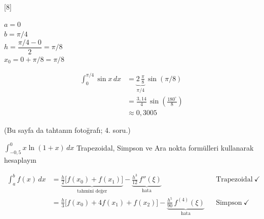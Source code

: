 \documentclass[11pt,a4paper]{article}
\begin{document}
[8]

\noindent
\begin{minipage}[t]{0.42\linewidth}
$a = 0$\\
$b = \pi/4$\\[1mm]
$h = \dfrac{\pi/4 - 0}{2} = \pi/8$\\[1mm]
$x_0 = 0 + \pi/8 = \pi/8$
\end{minipage}\hfill
\begin{minipage}[t]{0.55\linewidth}
\begin{align*}
  \int_0^{\pi/4} \sin x\,dx &= \underbrace{2\,\frac{\pi}{8}}_{\pi/4}\,\sin(\pi/8)\\
  &= \frac{3{,}14}{4}\,\sin\left(\frac{180^\circ}{8}\right)\\
  &\boxed{\approx 0{,}3005}
\end{align*}
\end{minipage}

{\small\color{kursunkalem}(Bu sayfa da tahtanın fotoğrafı; 4. soru.)}

\begin{ornek}[4]
$\displaystyle\int_{-0{,}5}^{0} x\ln(1+x)\,dx$ \qquad Trapezoidal, Simpson ve Ara nokta formülleri kullanarak
hesaplayın
\end{ornek}
\begin{align*}
  \int_a^b f(x)\,dx &= \underbrace{\frac{h}{2}\Big[f(x_0) + f(x_1)\Big]}_{\text{tahmini değer}}
     - \underbrace{\frac{h^3}{12}\,f''(\xi)}_{\text{hata}}
     && \text{Trapezoidal}\ \checkmark\\
  &= \frac{h}{3}\Big[f(x_0) + 4f(x_1) + f(x_2)\Big] - \underbrace{\frac{h^5}{90}\,f^{(4)}(\xi)}_{\text{hata}}
     && \text{Simpson}\ \checkmark
\end{align*}
\end{document}

